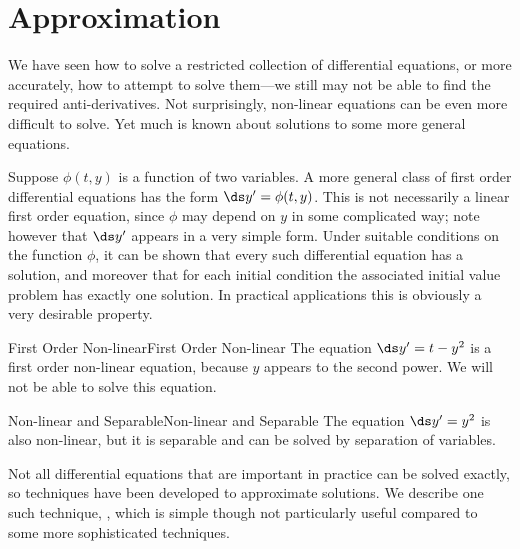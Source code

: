 \section{Approximation}{}{}\label{sec:Approximation of differential equations}
We have seen how to solve a restricted collection of differential
equations, or more  accurately, how to attempt to solve them---we still may
not be able to find the required anti-derivatives. Not surprisingly,
non-linear equations can be even more difficult to solve. Yet much is
known about solutions to some more general equations.

Suppose $\phi(t,y)$ is a function of two variables. A more general
class of first order differential equations has the form $\ds y'=\phi(t,y)$.
This is not necessarily a linear first order equation,
since $\phi$ may depend on $y$ in some complicated way; note however
that $\ds y'$ appears in a very simple form. Under suitable
conditions on the function $\phi$, it can be shown that every such
differential equation has a solution, and moreover that for each
initial condition the associated initial value problem has exactly one
solution. In practical applications this is obviously a very desirable
property. 

\begin{example}{First Order Non-linear}{First Order Non-linear}\label{First Order Non-linear}
 The equation $\ds y'=t-y^2$ is a first order non-linear
equation, because $y$ appears to the second power. We will not be able
to solve this equation.
\end{example}

\begin{example}{Non-linear and Separable}{Non-linear and Separable}\label{Non-linear and Separable}
 The equation $\ds y'=y^2$ is also non-linear, but it is
separable and can be solved by separation of variables.
\end{example}

Not all differential equations that are important in practice can be
solved exactly, so techniques have been developed to approximate
solutions. We describe one such technique, , which is simple though not particularly
useful compared to some more sophisticated techniques.

